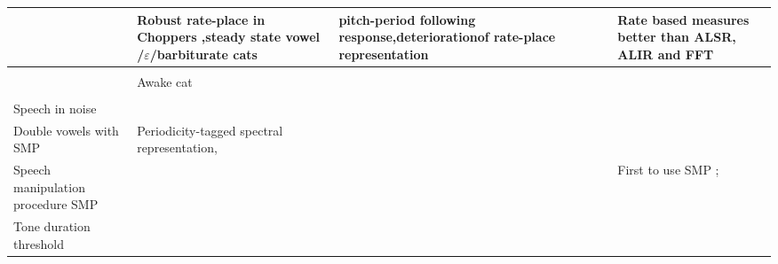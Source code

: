 \documentclass[10pt,a4paper]{article}
\begin{document}
\begin{flushleft}
\begin{supertabular}{|m{3.9609997cm}|m{2.9099998cm}|m{2.8739998cm}|m{2.846cm}|m{2.836cm}|m{2.839cm}|}
                                                                        & Robust rate-place in Choppers ,steady state vowel /$\varepsilon
            $/barbiturate cats \citep{BlackburnSachs:1990}              & \citep{PalmerWinter:1993}
pitch-period following response,deteriorationof rate-place representation
                      \citep{BlackburnSachs:1990}                       &                                                                          & & Rate based measures better than ALSR, ALIR
and FFT \citep{StevensWickesberg:2005}\\\hline
                                                                        &                          \citep{WangSachs:1994}                          & & 
                                                                        &                                                                          & \\\hline
                                                                        &                   Awake cat \citep{MayPrellEtAl:1998}                    & & & & \\\hline
                                                                        &                                                                          & & & 
                                                                        & \\\hline
                            Speech in noise                             &                      \citep{WinterPalmerEtAl:2003}                       & & & & 
\citep{Geisler:1989a, b,GeislerGamble:1989,SachsWinslowEtAl:1983}\\\hline
                        Double vowels with SMP                          & Periodicity-tagged spectral
            representation,\citep{KeilsonRichardsEtAl:1997}             &                                                                          & & & 
\citep{Palmer:1990}\\\hline
                   Speech manipulation procedure SMP                    & 
 \citep{May:2003,MayHuangEtAl:1996,MayPrellEtAl:1998,RecioRhode:2000}   &                                                                          & & & 
First to use SMP\citep{LeSachsEtAl:1996} ;\citep{May:2003}\\\hline
Tone
                          duration threshold                            & 


\end{supertabular}
\end{flushleft}
\end{document}
